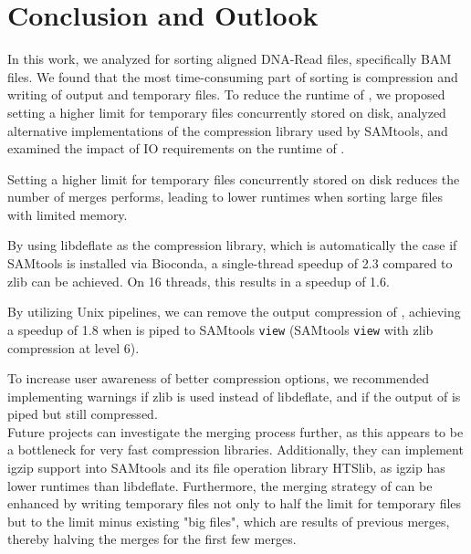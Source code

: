\section{Conclusion and Outlook}

In this work, we analyzed \sort for sorting aligned DNA-Read files, specifically BAM files. We found that the most time-consuming part of sorting is compression and writing of output and temporary files. To reduce the runtime of \sort, we proposed setting a higher limit for temporary files concurrently stored on disk, analyzed alternative implementations of the compression library used by SAMtools, and examined the impact of IO requirements on the runtime of \sort.

Setting a higher limit for temporary files concurrently stored on disk reduces the number of merges \sort performs, leading to lower runtimes when sorting large files with limited memory.

By using libdeflate as the compression library, which is automatically the case if SAMtools is installed via Bioconda, a single-thread speedup of 2.3 compared to zlib can be achieved. On 16 threads, this results in a speedup of 1.6.

By utilizing Unix pipelines, we can remove the output compression of \sort, achieving a speedup of 1.8 when \sort is piped to SAMtools \texttt{view} (SAMtools \texttt{view} with zlib compression at level 6).

To increase user awareness of better compression options, we recommended implementing warnings if zlib is used instead of libdeflate, and if the output of \sort is piped but still compressed. \\

Future projects can investigate the merging process further, as this appears to be a bottleneck for very fast compression libraries. Additionally, they can implement igzip support into SAMtools and its file operation library HTSlib, as igzip has lower runtimes than libdeflate. Furthermore, the merging strategy of \sort can be enhanced by writing temporary files not only to half the limit for temporary files but to the limit minus existing "big files", which are results of previous merges, thereby halving the merges for the first few merges.